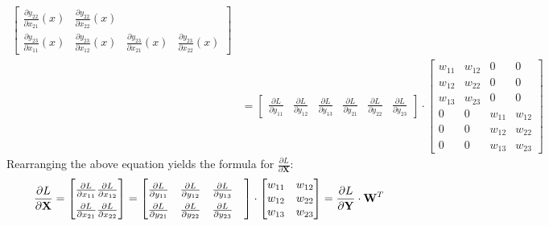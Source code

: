 \documentclass{article}
\begin{document}
\begin{align*}
\begin{bmatrix}
            \frac{\partial y_{22}}{\partial x_{21}}(x) & \frac{\partial y_{22}}{\partial x_{22}}(x) \\
            \frac{\partial y_{23}}{\partial x_{11}}(x) & \frac{\partial y_{23}}{\partial x_{12}}(x) &
            \frac{\partial y_{23}}{\partial x_{21}}(x) & \frac{\partial y_{23}}{\partial x_{22}}(x)
        \end{bmatrix} \\ &=
        \begin{bmatrix}
            \frac{\partial L}{\partial y_{11}} & \frac{\partial L}{\partial y_{12}} & 
            \frac{\partial L}{\partial y_{13}} & \frac{\partial L}{\partial y_{21}} & 
            \frac{\partial L}{\partial y_{22}} & \frac{\partial L}{\partial y_{23}}
        \end{bmatrix} \cdot
        \begin{bmatrix}
            w_{11} & w_{12} & 0 & 0 \\
            w_{12} & w_{22} & 0 & 0 \\
            w_{13} & w_{23} & 0 & 0 \\
            0 & 0 & w_{11} & w_{12} \\
            0 & 0 & w_{12} & w_{22} \\
            0 & 0 & w_{13} & w_{23}
        \end{bmatrix}
\end{align*}
Rearranging the above equation yields the formula for $\frac{\partial L}{\partial \mathbf{X}}$:
    \[
        \frac{\partial L}{\partial \mathbf{X}} = 
        \renewcommand{\arraystretch}{1.5}
        \begin{bmatrix}
            \frac{\partial L}{\partial x_{11}} \frac{\partial L}{\partial x_{12}} \\
            \frac{\partial L}{\partial x_{21}} \frac{\partial L}{\partial x_{22}}
        \end{bmatrix} = 
        \begin{bmatrix}
            \frac{\partial L}{\partial y_{11}} & \frac{\partial L}{\partial y_{12}} &
            \frac{\partial L}{\partial y_{13}} & \\
            \frac{\partial L}{\partial y_{21}} & \frac{\partial L}{\partial y_{22}} & 
            \frac{\partial L}{\partial y_{23}}
        \end{bmatrix} \cdot
        \renewcommand{\arraystretch}{1}
        \begin{bmatrix}
            w_{11} & w_{12} \\
            w_{12} & w_{22} \\
            w_{13} & w_{23} 
        \end{bmatrix}
        = 
        \frac{\partial L}{\partial \mathbf{Y}} \cdot \mathbf{W}^T
    \]
\end{document}
